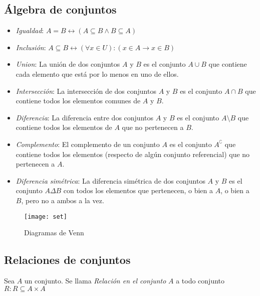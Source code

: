 \documentclass[a4paper, twoside]{article}
\begin{document}
\subsection{Álgebra de conjuntos}
\begin{itemize}
	\item \emph{Igualdad}: $ A = B \leftrightarrow (A \subseteq B \wedge B \subseteq A)$
	\item \emph{Inclusión}: $A \subseteq B \leftrightarrow (\forall x \in U):(x \in A \rightarrow x \in B)$
	\item \emph{Union}: La unión de dos conjuntos $A$ y $B$ es el conjunto $A \cup B$ que contiene cada elemento que está por lo menos en uno de ellos.

	\item \emph{Intersección}: La intersección de dos conjuntos $A$ y $B$ es el conjunto $A \cap B$ que contiene todos los elementos comunes de $A$ y $B$.

	\item \emph{Diferencia}: La diferencia entre dos conjuntos $A$ y $B$ es el conjunto $A \setminus B$ que contiene todos los elementos de $A$ que no pertenecen a $B$.

	\item \emph{Complemento}: El complemento de un conjunto $A$ es el conjunto $A^\complement$ que contiene todos los elementos (respecto de algún conjunto referencial) que no pertenecen a $A$.

	\item \emph{Diferencia simétrica}: La diferencia simétrica de dos conjuntos $A$ y $B$ es el conjunto $A \Delta B$ con todos los elementos que pertenecen, o bien a $A$, o bien a $B$, pero no a ambos a la vez.
\end{itemize}

\begin{figure}[H]
	\centering
	\texttt{[image: set]}
	\caption{Diagramas de Venn}
	\label{fig:set}
\end{figure}

\subsection{Relaciones de conjuntos}
Sea $A$ un conjunto. Se llama \emph{Relación en el conjunto} $A$ a todo 
conjunto $R:R \subseteq A \times A$
\end{document}
